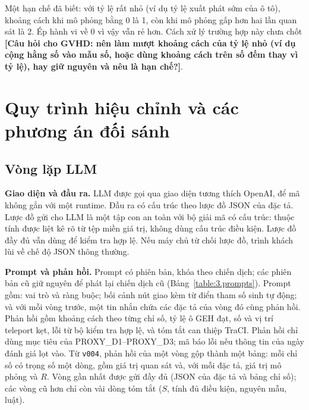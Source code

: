 \documentclass[../main.tex]{subfiles}
\begin{document}
Một hạn chế đã biết: với tỷ lệ rất nhỏ (ví dụ tỷ lệ xuất phát sớm của ô tô), khoảng cách khi mô phỏng bằng 0 là 1, còn khi mô phỏng gấp hơn hai lần quan sát là 2. Ép hành vi về 0 vì vậy vẫn rẻ hơn. Cách xử lý trường hợp này chưa chốt \textbf{[Câu hỏi cho GVHD: nên làm mượt khoảng cách của tỷ lệ nhỏ (ví dụ cộng hằng số vào mẫu số, hoặc dùng khoảng cách trên số đếm thay vì tỷ lệ), hay giữ nguyên và nêu là hạn chế?]}.

\section{Quy trình hiệu chỉnh và các phương án đối sánh}
\label{section:3.8}

\subsection{Vòng lặp LLM}

\textbf{Giao diện và đầu ra.} LLM được gọi qua giao diện tương thích OpenAI, để mã không gắn với một runtime. Đầu ra có cấu trúc theo lược đồ JSON của đặc tả. Lược đồ gửi cho LLM là một tập con an toàn với bộ giải mã có cấu trúc: thuộc tính được liệt kê rõ từ tệp miền giá trị, không dùng cấu trúc điều kiện. Lược đồ đầy đủ vẫn dùng để kiểm tra hợp lệ. Nếu máy chủ từ chối lược đồ, trình khách lùi về chế độ JSON thông thường.

\textbf{Prompt và phản hồi.} Prompt có phiên bản, khóa theo chiến dịch; các phiên bản cũ giữ nguyên để phát lại chiến dịch cũ (Bảng~\ref{table:3.prompts}). Prompt gồm: vai trò và ràng buộc; bối cảnh nút giao kèm từ điển tham số sinh tự động; và với mỗi vòng trước, một tin nhắn chứa các đặc tả của vòng đó cùng phản hồi. Phản hồi gồm khoảng cách theo từng chỉ số, tỷ lệ ô GEH đạt, số và vị trí teleport kẹt, lỗi từ bộ kiểm tra hợp lệ, và tóm tắt can thiệp TraCI. Phản hồi chỉ dùng mục tiêu của PROXY\_D1--PROXY\_D3; mã báo lỗi nếu thông tin của ngày đánh giá lọt vào. Từ \texttt{v004}, phản hồi của một vòng gộp thành một bảng: mỗi chỉ số có trọng số một dòng, gồm giá trị quan sát và, với mỗi đặc tả, giá trị mô phỏng và $R$. Vòng gần nhất được gửi đầy đủ (JSON của đặc tả và bảng chỉ số); các vòng cũ hơn chỉ còn vài dòng tóm tắt ($S$, tính đủ điều kiện, nguyên mẫu, luật).
\end{document}
